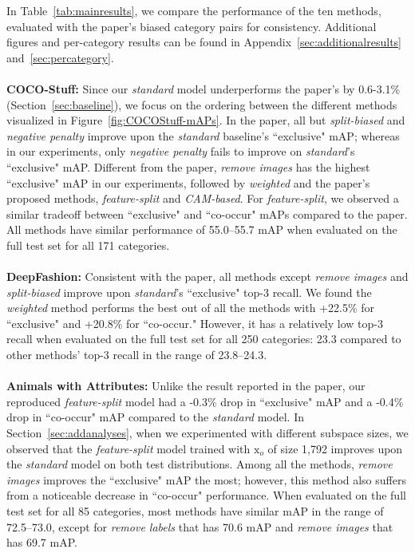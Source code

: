 In Table~\ref{tab:mainresults}, we compare the performance of the ten methods, evaluated with the paper's biased category pairs for consistency. Additional figures and per-category results can be found in Appendix~\ref{sec:additionalresults} and~\ref{sec:percategory}.\\
\\
\textbf{COCO-Stuff:} Since our \emph{standard} model underperforms the paper's by 0.6-3.1\% (Section~\ref{sec:baseline}), we focus on the ordering between the different methods visualized in Figure~\ref{fig:COCOStuff-mAPs}. In the paper, all but \textit{split-biased} and \textit{negative penalty} improve upon the \textit{standard} baseline's ``exclusive" mAP; whereas in our experiments, only \emph{negative penalty} fails to improve on \textit{standard}'s ``exclusive" mAP. Different from the paper, \textit{remove images} has the highest ``exclusive" mAP in our experiments, followed by \textit{weighted} and the paper's proposed methods, \emph{feature-split} and \emph{CAM-based}. For \emph{feature-split}, we observed a similar tradeoff between ``exclusive" and ``co-occur" mAPs compared to the paper. All methods have similar performance of 55.0--55.7 mAP when evaluated on the full test set for all 171 categories.\\
\\
\textbf{DeepFashion:} Consistent with the paper, all methods except \textit{remove images} and \textit{split-biased} improve upon \emph{standard}'s ``exclusive" top-3 recall. We found the \textit{weighted} method performs the best out of all the methods with +22.5\% for ``exclusive" and +20.8\% for ``co-occur." However, it has a relatively low top-3 recall when evaluated on the full test set for all 250 categories: 23.3 compared to other methods' top-3 recall in the range of 23.8--24.3.\\
\\
\textbf{Animals with Attributes:} Unlike the result reported in the paper, our reproduced \textit{feature-split} model had a -0.3\% drop in ``exclusive" mAP and a -0.4\% drop in ``co-occur" mAP compared to the \textit{standard} model. 
In Section~\ref{sec:addanalyses}, when we experimented with different subspace sizes, we observed that the \textit{feature-split} model trained with $\mathrm{x}_o$ of size 1,792 improves upon the \textit{standard} model on both test distributions.
Among all the methods, \emph{remove images} improves the ``exclusive" mAP the most; however, this method also suffers from a noticeable decrease in ``co-occur" performance.
When evaluated on the full test set for all 85 categories, most methods have similar mAP in the range of 72.5--73.0, except for \emph{remove labels} that has 70.6 mAP and \emph{remove images} that has 69.7 mAP.\\
